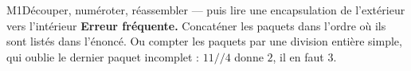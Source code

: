 \begin{fichemethode}{M1}{Découper, numéroter, réassembler --- puis lire une encapsulation de l'extérieur vers l'intérieur}
\textbf{Erreur fréquente.} Concaténer les paquets dans l'ordre où ils sont listés dans
l'énoncé. Ou compter les paquets par une division entière simple, qui oublie le dernier
paquet incomplet : $11 // 4$ donne $2$, il en faut $3$.

\end{fichemethode}
